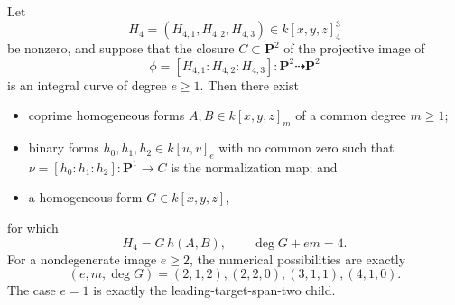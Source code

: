\begin{proposition}
\label{prop:lane4-leading-image-direct}
Let
\[
 H_4=(H_{4,1},H_{4,2},H_{4,3})\in k[x,y,z]_4^3
\]
be nonzero, and suppose that the closure \(C\subset \mathbf P^2\) of the
projective image of
\[
 \phi=[H_{4,1}:H_{4,2}:H_{4,3}]
 \colon \mathbf P^2\dashrightarrow \mathbf P^2
\]
is an integral curve of degree \(e\geq 1\).  Then there exist
\begin{itemize}
\item coprime homogeneous forms \(A,B\in k[x,y,z]_m\) of a common degree
  \(m\geq 1\);
\item binary forms \(h_0,h_1,h_2\in k[u,v]_e\) with no common zero such that
  \(\nu=[h_0:h_1:h_2]\colon\mathbf P^1\to C\) is the normalization map; and
\item a homogeneous form \(G\in k[x,y,z]\),
\end{itemize}
for which
\[
 H_4=G\,h(A,B),\qquad \deg G+em=4.
\]
For a nondegenerate image \(e\geq2\), the numerical possibilities are exactly
\[
 (e,m,\deg G)=(2,1,2),(2,2,0),(3,1,1),(4,1,0).
\]
The case \(e=1\) is exactly the leading-target-span-two child.
\end{proposition}

